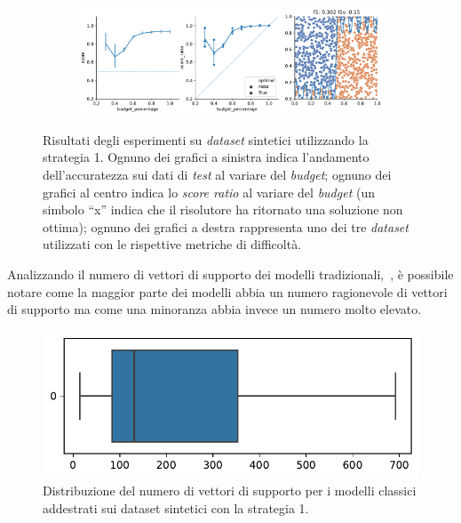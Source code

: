 \begin{figure}
\begin{subfigure}{.5\textwidth}
    \end{subfigure}%
    \hfill
    \begin{subfigure}{.5\textwidth}
        \centering
        \includegraphics[width=\textwidth]{img/2d/15.pdf}
    \end{subfigure}%
    \caption[Risultati su \emph{dataset} sintetici utilizzando la strategia 1.]{Risultati degli esperimenti su \emph{dataset} sintetici utilizzando la strategia 1. Ognuno dei grafici a sinistra indica l'andamento dell'accuratezza sui dati di \emph{test} al variare del \emph{budget}; ognuno dei grafici al centro indica lo \emph{score ratio} al variare del \emph{budget} (un simbolo ``x'' indica che il risolutore ha ritornato una soluzione non ottima); ognuno dei grafici a destra rappresenta uno dei tre \emph{dataset} utilizzati con le rispettive metriche di difficoltà.}
\label{fig:risultati_2d}
\end{figure}


Analizzando il numero di vettori di supporto dei modelli tradizionali,~, è possibile notare come la maggior parte dei modelli abbia un numero ragionevole di vettori di supporto ma come una minoranza abbia invece un numero molto elevato.
\begin{figure}
    \centering
    \includegraphics[width=0.5\linewidth]{img/2d/numsv.pdf}
    \caption{Distribuzione del numero di vettori di supporto per i modelli classici addestrati sui dataset sintetici con la strategia 1.}
    \label{fig:2d_dist_numsv}
\end{figure}

